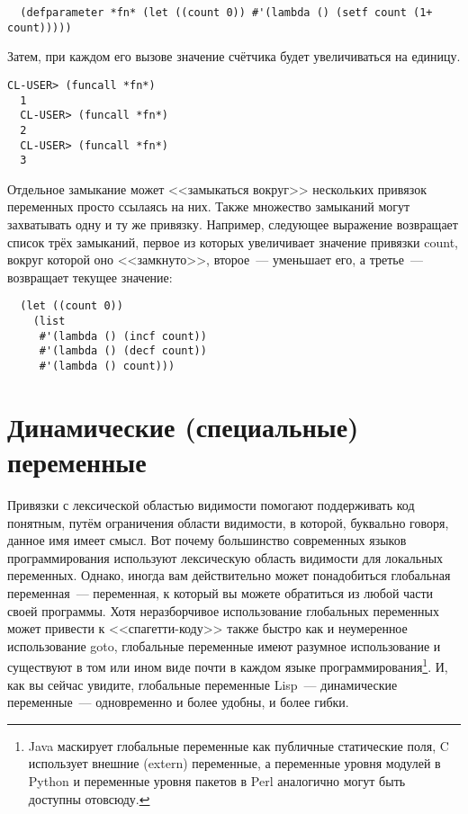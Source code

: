 \begin{lstlisting}
  (defparameter *fn* (let ((count 0)) #'(lambda () (setf count (1+ count)))))
\end{lstlisting}

Затем, при каждом его вызове значение счётчика будет увеличиваться на единицу.

\begin{lstlisting}[style=lisprepl]
  CL-USER> (funcall *fn*)
  1
  CL-USER> (funcall *fn*)
  2
  CL-USER> (funcall *fn*)
  3
\end{lstlisting}

Отдельное замыкание может <<замыкаться вокруг>> нескольких привязок переменных просто
ссылаясь на них. Также множество замыканий могут захватывать одну и ту же
привязку. Например, следующее выражение возвращает список трёх замыканий, первое из
которых увеличивает значение привязки count, вокруг которой оно <<замкнуто>>, второе~---
уменьшает его, а третье~--- возвращает текущее значение:

\begin{lstlisting}
  (let ((count 0))
    (list
     #'(lambda () (incf count))
     #'(lambda () (decf count))
     #'(lambda () count)))
\end{lstlisting}

\section{Динамические (специальные) переменные}

Привязки с лексической областью видимости помогают поддерживать код понятным, путём
ограничения области видимости, в которой, буквально говоря, данное имя имеет смысл. Вот
почему большинство современных языков программирования используют лексическую область
видимости для локальных переменных. Однако, иногда вам действительно может понадобиться
глобальная переменная~--- переменная, к который вы можете обратиться из любой части своей
программы. Хотя неразборчивое использование глобальных переменных может привести к
<<спагетти-коду>> также быстро как и неумеренное использование goto, глобальные переменные
имеют разумное использование и существуют в том или ином виде почти в каждом языке
программирования\footnote{Java маскирует глобальные переменные как публичные статические
  поля, C использует внешние (extern) переменные, а переменные уровня модулей в Python и
  переменные уровня пакетов в Perl аналогично могут быть доступны отовсюду.}. И, как вы
сейчас увидите, глобальные переменные Lisp~--- динамические переменные~--- одновременно и
более удобны, и более гибки.


